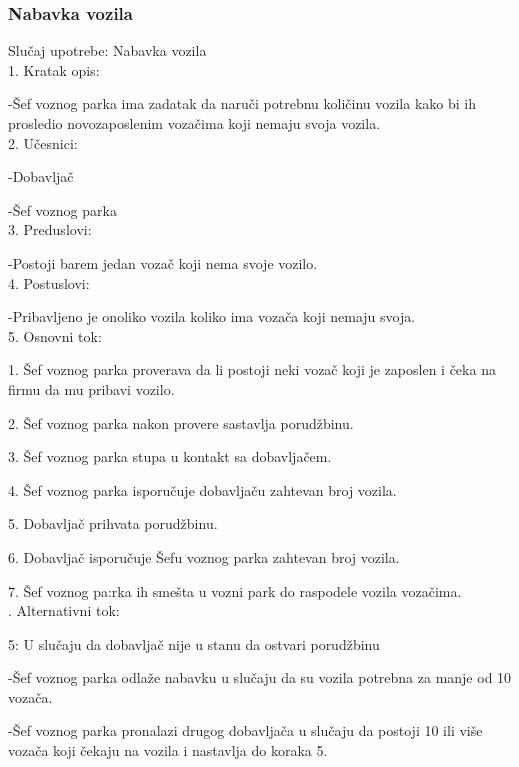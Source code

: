 \subsubsection{\bfseries Nabavka vozila}
\noindent Slučaj upotrebe: Nabavka vozila\\
1. Kratak opis:
\par -Šef voznog parka ima zadatak da naruči potrebnu količinu vozila kako bi ih prosledio novozaposlenim vozačima koji nemaju svoja vozila.\\
2. Učesnici:
\par -Dobavljač
\par -Šef voznog parka\\
3. Preduslovi:
\par -Postoji barem jedan vozač koji nema svoje vozilo.\\
4. Postuslovi:
\par -Pribavljeno je onoliko vozila koliko ima vozača koji nemaju svoja.\\
5. Osnovni tok:
\par 1. Šef voznog parka proverava da li postoji neki vozač koji je zaposlen i čeka na firmu da mu pribavi vozilo.
\par 2. Šef voznog parka nakon provere sastavlja porudžbinu.
\par 3. Šef voznog parka stupa u kontakt sa dobavljačem.
\par 4. Šef voznog parka isporučuje dobavljaču zahtevan broj vozila.
\par 5. Dobavljač prihvata porudžbinu.
\par 6. Dobavljač isporučuje Šefu voznog parka zahtevan broj vozila.
\par 7. Šef voznog pa:rka ih smešta u vozni park do raspodele vozila vozačima.\\

. Alternativni tok:
	\par 5: U slučaju da dobavljač nije u stanu da ostvari porudžbinu
	\par	-Šef voznog parka odlaže nabavku u slučaju da su vozila potrebna za manje od 10 vozača.
	\par	-Šef voznog parka pronalazi drugog dobavljača u slučaju da postoji 10 ili više vozača koji čekaju na vozila i nastavlja do koraka 5.

